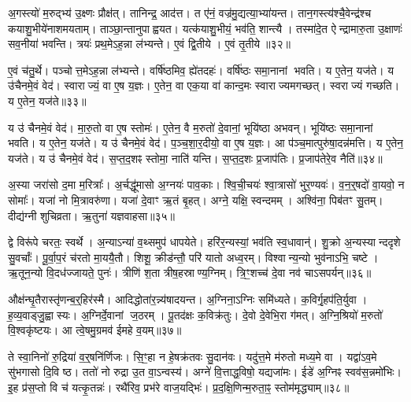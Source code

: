 अ॒गस्त्यो॑ म॒रुद्भ्य॑ उ॒क्ष्णः प्रौक्ष॑त्।
तानिन्द्र॒ आद॑त्त।
त ए॑नं॒ वज्र॑मु॒द्यत्या॒भ्या॑यन्त।
तान॒गस्त्य॑श्चै॒वेन्द्र॑श्च कयाशु॒भीये॑नाशमयताम्।
ताञ्छा॒न्तानुपाह्वयत।
यत्क॑याशु॒भीयं॒ भव॑ति॒ शान्त्यै।
तस्मा॑दे॒त ऐन्द्रामारु॒ता उ॒क्षाणः॑ सव॒नीया॑ भवन्ति।
त्रयः॑ प्रथ॒मे\-ऽह॒न्ना ल॑भ्यन्ते।
ए॒वं द्वि॒तीये।
ए॒वं तृ॒तीये॥३२॥

ए॒वं च॑तु॒र्थे।
पञ्चोत्त॒मे\-ऽह॒न्ना ल॑भ्यन्ते।
वर्\mbox{}षि॑ष्ठमिव॒ ह्ये॑तदहः॑।
वर्\mbox{}षि॑ष्ठः समा॒नानां भवति।
य ए॒तेन॒ यज॑ते।
य उ॑चैनमे॒वं वेद॑।
स्वाराज्यं॒ वा ए॒ष य॒ज्ञः।
ए॒तेन॒ वा एक॒या वा॑ कान्द॒मः स्वाराज्यमगच्छत्।
स्वराज्यं गच्छति।
य ए॒तेन॒ यज॑ते॥३३॥

य उ॑ चैनमे॒वं वेद॑।
मा॒रु॒तो वा ए॒ष स्तोमः॑।
ए॒तेन॒ वै म॒रुतो॑ दे॒वानां॒ भूयि॑ष्ठा अभवन्।
भूयि॑ष्ठः समा॒नानां भवति।
य ए॒तेन॒ यज॑ते।
य उ॑ चैनमे॒वं वेद॑।
प॒ञ्च॒शा॒र॒दीयो॒ वा ए॒ष य॒ज्ञः।
आ प॑ञ्च॒मात्पुरु॑षा॒दन्न॑मत्ति।
य ए॒तेन॒ यज॑ते।
य उ॑ चैनमे॒वं वेद॑।
स॒प्त॒द॒शꣴ स्तोमा॒ नाति॑ यन्ति।
स॒प्त॒द॒शः प्र॒जाप॑तिः।
प्र॒जाप॑तेरे॒व नैति॑॥३४॥\anuvakamend[तृ॒तीये॑ गच्छति॒ य ए॒तेन॒ यज॑ते\-ऽत्ति॒ य ए॒तेन॒ यज॑ते॒ य उ॑ चैनमे॒वं वेद॒ त्रीणि॑ च (अ॒गस्त्यः॒ स्वाराज्यं मारु॒तः प॑ञ्चशार॒दीयो॒ वा ए॒ष य॒ज्ञः स॑प्तद॒शं प्र॒जाप॑तेरे॒व नैति॑॥)]

अ॒स्या जरा॑सो द॒मा म॒रित्राः᳚।
अ॒र्चद्धू॑मासो अ॒ग्नयः॑ पाव॒काः।
श्वि॒ची॒चयः॑ श्वा॒त्रासो॑ भुर॒ण्यवः॑।
व॒न॒र्॒षदो॑ वा॒यवो॒ न सोमाः᳚।
यजा॑ नो मि॒त्रावरु॑णा।
यजा॑ दे॒वाꣳ ऋ॒तं बृ॒हत्।
अग्ने॒ यक्षि॒ स्वन्दमम्।
अश्वि॑ना॒ पिब॑तꣳ सु॒तम्।
दीद्य॑ग्नी शुचिव्रता।
ऋ॒तुना॑ यज्ञवाहसा॥३५॥

द्वे विरू॑पे चरतः॒ स्वर्थे।
अ॒न्या\-ऽन्या॑ व॒थ्समुप॑ धापयेते।
हरि॑र॒न्यस्यां॒ भव॑ति स्व॒धावान्॑।
शु॒क्रो अ॒न्यस्यान्ददृशे सु॒वर्चाः᳚।
पू॒र्वा॒प॒रं च॑रतो मा॒ययै॒तौ।
शिशू॒ क्रीड॑न्तौ॒ परि॑ यातो अध्व॒रम्।
विश्वान्य॒न्यो भुव॑नाऽभि॒ चष्टे।
ऋ॒तून॒न्यो वि॒दध॑ज्जायते॒ पुनः॑।
त्रीणि॑ श॒ता त्रीष॒हस्राण्य॒ग्निम्।
त्रि॒ꣳ॒शच्च॑ दे॒वा नव॑ चाऽसपर्यन्॥३६॥

औक्ष॑न्घृ॒तैरास्तृ॑णन्ब॒र्॒हिर॑स्मै।
आदिद्धोता॑र॒न्न्य॑षादयन्त।
अ॒ग्निना॒\-ऽग्निः समि॑ध्यते।
क॒विर्गृ॒हप॑ति॒र्युवा।
ह॒व्य॒वाड्जु॒ह्वास्यः।
अ॒ग्निर्दे॒वानां ज॒ठरम्।
पू॒तद॑क्षः क॒विक्र॑तुः।
दे॒वो दे॒वेभि॒रा ग॑मत्।
अ॒ग्नि॒श्रियो॑ म॒रुतो॑ वि॒श्वकृ॑ष्टयः।
आ त्वे॒षमु॒ग्रमव॑ ईमहे व॒यम्॥३७॥

ते स्वा॒निनो॑ रु॒द्रिया॑ व॒र्॒षनि॑र्णिजः।
सि॒ꣳ॒हा न हे॒षक्र॑तवः सु॒दान॑वः।
यदु॑त्त॒मे म॑रुतो मध्य॒मे वा।
यद्वा॑\-ऽव॒मे सु॑भगासो दि॒वि ष्ठ।
ततो॑ नो रुद्रा उ॒त वा॒\-ऽन्वस्य॑।
अग्ने॑ वि॒त्ताद्ध॒विषो॒ यद्यजा॑मः।
ईडे॑ अ॒ग्निꣴ स्वव॑स॒न्नमो॑भिः।
इ॒ह प्र॑स॒प्तो वि च॑ यत्कृ॒तन्नः॑।
रथै॑रिव॒ प्रभ॑रे वाज॒यद्भिः॑।
प्र॒द॒क्षि॒णिन्म॒रुता॒ꣴ॒ स्तोम॑मृद्ध्याम्॥३८॥

